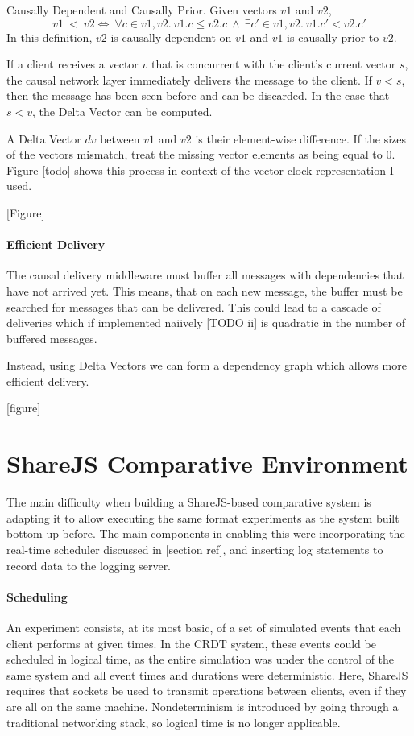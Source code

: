 \documentclass[12pt,a4paper,twoside,openright]{report}
\begin{document}
		Causally Dependent and Causally Prior. Given vectors $v1$ and $v2$, \[v1\ <\ v2 \iff\ \forall c \in v1, v2.\ v1.c \leq v2.c\ \land\ \exists c' \in v1, v2.\ v1.c' < v2.c'\]
		In this definition, $v2$ is causally dependent on $v1$ and $v1$ is causally prior to $v2$.
		
		If a client receives a vector $v$ that is concurrent with the client's current vector $s$, the causal network layer immediately delivers the message to the client. If $v < s$, then the message has been seen before and can be discarded. In the case that $s < v$, the Delta Vector can be computed.
		
		A Delta Vector $dv$ between $v1$ and $v2$ is their element-wise difference. If the sizes of the vectors mismatch, treat the missing vector elements as being equal to 0. Figure [todo] shows this process in context of the vector clock representation I used.
		
		[Figure]
		
		\paragraph{Efficient Delivery}
		The causal delivery middleware must buffer all messages with dependencies that have not arrived yet. This means, that on each new message, the buffer must be searched for messages that can be delivered. This could lead to a cascade of deliveries which if implemented naiively [TODO ii] is quadratic in the number of buffered messages.
		
		Instead, using Delta Vectors we can form a dependency graph which allows more efficient delivery.
		
		[figure]
	
\section{ShareJS Comparative Environment}

	The main difficulty when building a ShareJS-based comparative system is adapting it to allow executing the same format experiments as the system built bottom up before. The main components in enabling this were incorporating the real-time scheduler discussed in [section ref], and inserting log statements to record data to the logging server.
	
	\paragraph{Scheduling}
	An experiment consists, at its most basic, of a set of simulated events that each client performs at given times. In the CRDT system, these events could be scheduled in logical time, as the entire simulation was under the control of the same system and all event times and durations were deterministic. Here, ShareJS requires that sockets be used to transmit operations between clients, even if they are all on the same machine. Nondeterminism is introduced by going through a traditional networking stack, so logical time is no longer applicable.
	
\end{document}
